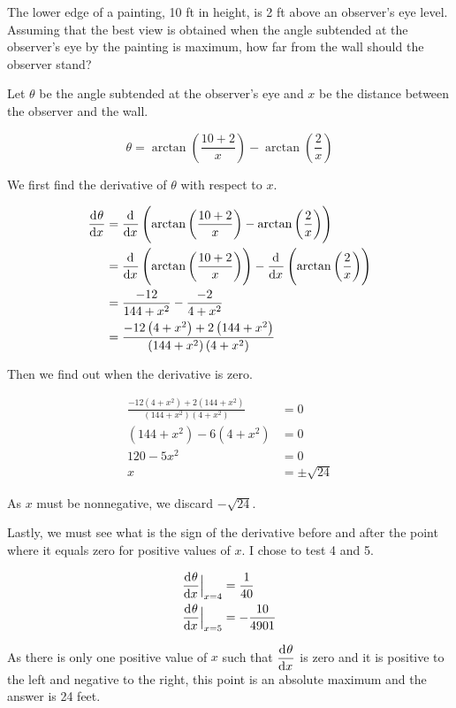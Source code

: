 \documentclass[a4paper, titlepage]{article}
\begin{document}
\begin{Exercise}
The lower edge of a painting, 10 ft in height, is 2 ft above
an observer’s eye level. Assuming that the best view is obtained
when the angle subtended at the observer's eye by the painting
is maximum, how far from the wall should the observer stand?
\cite{anton-bivens-davis}
\end{Exercise}

\begin{Answer}

Let \(\theta\) be the angle subtended at the observer's eye
and \(x\) be the distance between the observer and the wall.

\[\theta = \arctan \left( \frac{10 + 2}{x} \right) - \arctan \left( \frac{2}{x} \right)\]

We first find the derivative of \(\theta\) with respect to \(x\).

\begin{align*}
  \dod{\theta}{x} &= \dod{}{x} \left( \arctan \left( \frac{10 + 2}{x} \right) - \arctan \left( \frac{2}{x} \right) \right) \\
   &= \dod{}{x} \left( \arctan \left( \frac{10 + 2}{x} \right) \right)
    - \dod{}{x} \left( \arctan \left( \frac{2}{x} \right) \right) \\
   &= \frac{-12}{144 + x^2} - \frac{-2}{4 + x^2} \\
   &= \frac{-12 \left( 4 + x^2 \right) + 2 \left( 144 + x^2 \right)}
           {\left( 144 + x^2 \right) \left( 4 + x^2 \right)} \\
\end{align*}

Then we find out when the derivative is zero.

\begin{align*}
  \frac{-12 \left( 4 + x^2 \right) + 2 \left( 144 + x^2 \right)}
       {\left( 144 + x^2 \right) \left( 4 + x^2 \right)} &= 0 \\
  \left( 144 + x^2 \right) - 6 \left( 4 + x^2 \right) &= 0 \\
  120 - 5 x^2 &= 0 \\
  x &= \pm \sqrt{24}
\end{align*}

As \(x\) must be nonnegative, we discard \(- \sqrt{24}\).

Lastly, we must see what is the sign of the derivative before and after the point where it
equals zero for positive values of \(x\). I chose to test 4 and 5.

\begin{align*}
  \dod{\theta}{x}\Bigr|_{\substack{\\x = 4}} &= \frac{1}{40} \\
  \dod{\theta}{x}\Bigr|_{\substack{\\x = 5}} &= - \frac{10}{4901}
\end{align*}

As there is only one positive value of \(x\) such that \(\dod{\theta}{x}\) is zero
and it is positive to the left and negative to the right, this point is an absolute maximum
and the answer is 24 feet.

\end{Answer}
\end{document}

